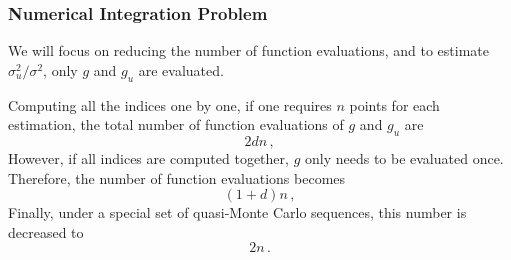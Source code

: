 \documentclass[11pt,compress]{beamer} %
\DeclareMathOperator{\Var}{Var}
\begin{document}

\begin{frame}
\frametitle{Numerical Integration Problem}
We will focus on reducing the number of function evaluations, and to estimate $\sigma_u^2/\sigma^2$, only $g$ and $g_u$ are evaluated.

Computing all the indices one by one, if one requires $n$ points for each estimation, the total number of function evaluations of $g$ and $g_u$ are
\[
2dn\, ,
\]
However, if all indices are computed together, $g$ only needs to be evaluated once. Therefore, the number of function evaluations becomes
\[
(1+d)n\, ,
\]
Finally, under a special set of quasi-Monte Carlo sequences, this number is decreased to
\[
2n\, .
\]
\end{frame}
\end{document}
